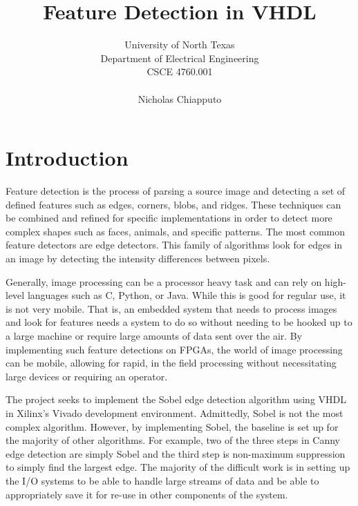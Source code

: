 \documentclass[12pt]{article}
\begin{document}
	\title{ Feature Detection in VHDL }

	\author{	University of North Texas \\
				Department of Electrical Engineering \\
				CSCE 4760.001 \\ \\
				Nicholas Chiapputo \\
	}

	\maketitle

	\section{Introduction}
		Feature detection is the process of parsing a source image and detecting a set of defined features such as edges, corners, blobs, and ridges. These techniques can be combined and refined for specific implementations in order to detect more complex shapes such as faces, animals, and specific patterns. The most common feature detectors are edge detectors. This family of algorithms look for edges in an image by detecting the intensity differences between pixels. 
 
		Generally, image processing can be a processor heavy task and can rely on high-level languages such as C, Python, or Java. While this is good for regular use, it is not very mobile. That is, an embedded system that needs to process images and look for features needs a system to do so without needing to be hooked up to a large machine or require large amounts of data sent over the air. By implementing such feature detections on FPGAs, the world of image processing can be mobile, allowing for rapid, in the field processing without necessitating large devices or requiring an operator. 

		The project seeks to implement the Sobel edge detection algorithm using VHDL in Xilinx's Vivado development environment. Admittedly, Sobel is not the most complex algorithm. However, by implementing Sobel, the baseline is set up for the majority of other algorithms. For example, two of the three steps in Canny edge detection are simply Sobel and the third step is non-maximum suppression to simply find the largest edge. The majority of the difficult work is in setting up the I/O systems to be able to handle large streams of data and be able to appropriately save it for re-use in other components of the system. 
\end{document}
